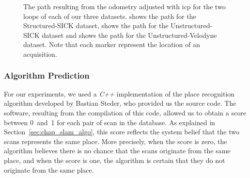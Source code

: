 \begin{figure}[H]
    \centering
    \caption[Path adjusted using \gls*{icp} for our three datasets.]{The path resulting from the odometry adjusted with \gls*{icp} for the two loops of each of our three datasets. \protect{} shows the path for the Structured-SICK dataset, \protect{} shows the path for the Unstructured-SICK dataset and \protect{} shows the path for the Unstructured-Velodyne dataset. Note that each marker represent the location of an acquisition.}
    \label{fig:chap_slam_results_paths}
\end{figure}


\subsubsection{Algorithm Prediction}
For our experiments, we used a \textit{C++} implementation of the place recognition algorithm developed by Bastian Steder, who provided us the source code. The software, resulting from the compilation of this code, allowed us to obtain a score between 0~and~1 for each pair of scan in the database. As explained in Section~\ref{sec:chap_slam_algo}, this score reflects the system belief that the two scans represents the same place. More precisely, when the score is zero, the algorithm believes there is no chance that the scans originate from the same place, and when the score is one, the algorithm is certain that they do not originate from the same place.


